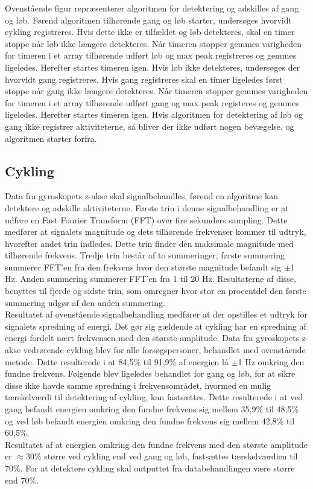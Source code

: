 Ovenstående figur repræsenterer algoritmen for detektering og adskilles af gang og løb. Førend algoritmen tilhørende gang og løb starter, undersøges hvorvidt cykling registreres. Hvis dette ikke er tilfældet og løb detekteres, skal en timer stoppe når løb ikke længere detekteres. Når timeren stopper gemmes varigheden for timeren i et array tilhørende udført løb og max peak registreres og gemmes ligeledes. Herefter startes timeren igen. Hvis løb ikke detekteres, undersøges der hvorvidt gang registreres. Hvis gang registreres skal en timer ligeledes først stoppe når gang ikke længere detekteres. Når timeren stopper gemmes varigheden for timeren i et array tilhørende udført gang og max peak registeres og gemmes ligeledes. Herefter startes timeren igen. Hvis algoritmen for detektering af løb og gang ikke registrer aktiviteterne, så bliver der ikke udført nogen bevægelse, og algoritmen starter forfra.

\subsection{Cykling}
Data fra gyroskopets z-akse skal signalbehandles, førend en algoritme kan detektere og adskille aktiviteterne. Første trin i denne signalbehandling er at udføre en Fast Fourier Transform (FFT) over fire sekunders sampling. Dette medfører at signalets magnitude og dets tilhørende frekvenser kommer til udtryk, hvorefter andet trin indledes. Dette trin finder den maksimale magnitude med tilhørende frekvens. Tredje trin består af to summeringer, første summering summerer FFT'en fra den frekvens hvor den største magnitude befandt sig $\pm$1 Hz. Anden summering summerer FFT'en fra 1 til 20 Hz. Resultaterne af disse, benyttes til fjerde og sidste trin, som omregner hvor stor en procentdel den første summering udgør af den anden summering. \\
Resultatet af ovenstående signalbehandling medfører at der opstilles et udtryk for signalets spredning af energi. Det gør sig gældende at cykling har en spredning af energi fordelt nært frekvensen med den største amplitude. Data fra gyroskopets z-akse vedrørende cykling blev for alle forsøgspersoner, behandlet med ovenstående metode. Dette resulterede i at 84,5\% til 91,9\% af energien lå $\pm$1 Hz omkring den fundne frekvens. Følgende blev ligeledes behandlet for gang og løb, for at sikre disse ikke havde samme spredning i frekvensområdet, hvormed en mulig tærskelværdi til detektering af cykling, kan fastsættes.  Dette resulterede i at ved gang befandt energien omkring den fundne frekvens sig mellem 35,9\% til 48,5\% og ved løb befandt energien omkring den fundne frekvens sig mellem 42,8\% til 60,5\%. \\
Resultatet af at energien omkring den fundne frekvens med den største amplitude er $\approx$30\% større ved cykling end ved gang og løb, fastsættes tærskelværdien til 70\%. For at detektere cykling skal outputtet fra databehandlingen være større end 70\%.

